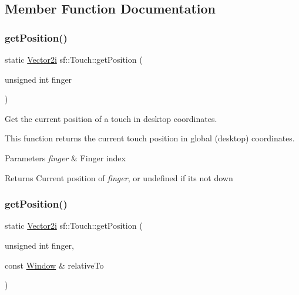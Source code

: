 \subsection{Member Function Documentation}
\mbox{\label{classsf_1_1_touch_af1b7035be709091c7475075e43e2bc23}} 
\subsubsection{\texorpdfstring{getPosition()}{getPosition()}\hspace{0.1cm}{\footnotesize\ttfamily [1/2]}}
{\footnotesize\ttfamily static \mbox{\hyperlink{classsf_1_1_vector2}{Vector2i}} sf\+::\+Touch\+::get\+Position (\begin{DoxyParamCaption}\item[{unsigned int}]{finger }\end{DoxyParamCaption})\hspace{0.3cm}{\ttfamily [static]}}



Get the current position of a touch in desktop coordinates. 

This function returns the current touch position in global (desktop) coordinates.


\begin{DoxyParams}{Parameters}
{\em finger} & Finger index\\
\hline
\end{DoxyParams}
\begin{DoxyReturn}{Returns}
Current position of {\itshape finger}, or undefined if it\textquotesingle{}s not down \begin{DoxyVerb}\end{DoxyVerb}
 
\end{DoxyReturn}
\mbox{\label{classsf_1_1_touch_a372acaba3c7ac70fca4614c16ac4a1bb}} 
\subsubsection{\texorpdfstring{getPosition()}{getPosition()}\hspace{0.1cm}{\footnotesize\ttfamily [2/2]}}
{\footnotesize\ttfamily static \mbox{\hyperlink{classsf_1_1_vector2}{Vector2i}} sf\+::\+Touch\+::get\+Position (\begin{DoxyParamCaption}\item[{unsigned int}]{finger,  }\item[{const \mbox{\hyperlink{classsf_1_1_window}{Window}} \&}]{relative\+To }\end{DoxyParamCaption})\hspace{0.3cm}{\ttfamily [static]}}




